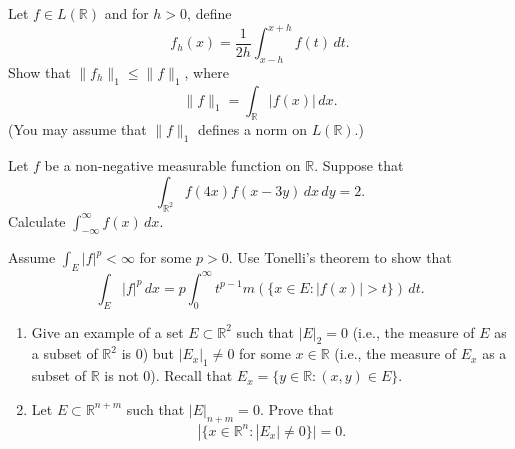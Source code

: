 
\begin{problem}{1}
Let $f \in L(\mathbb{R})$ and for $h > 0$, define
\[
f_h(x) = \frac{1}{2h} \int_{x-h}^{x+h} f(t) \, dt.
\]
Show that $\|f_h\|_1 \leq \|f\|_1$, where
\[
\|f\|_1 = \int_{\mathbb{R}} |f(x)| \, dx.
\]
(You may assume that $\|f\|_1$ defines a norm on $L(\mathbb{R})$.)
\end{problem}


\begin{solution}
\end{solution}

\pagebreak

\begin{problem}{2}
Let $f$ be a non-negative measurable function on $\mathbb{R}$. Suppose that
\[
\int_{\mathbb{R}^2} f(4x)f(x - 3y) \, dx \, dy = 2.
\]
Calculate $\int_{-\infty}^\infty f(x) \, dx$.
\end{problem}

\begin{solution}
\end{solution}

\pagebreak



\begin{problem}{3}
Assume $\int_E |f|^p < \infty$ for some $p > 0$. Use Tonelli's theorem to show that
\[
\int_E |f|^p \, dx = p \int_0^\infty t^{p-1} m(\{x \in E : |f(x)| > t\}) \, dt.
\]
\end{problem}

\begin{solution}
\end{solution}

\pagebreak



\begin{problem}{4}
\begin{enumerate}
    \item Give an example of a set $E \subset \mathbb{R}^2$ such that $|E|_2 = 0$ (i.e., the measure of $E$ as a subset of $\mathbb{R}^2$ is 0) but $|E_x|_1 \neq 0$ for some $x \in \mathbb{R}$ (i.e., the measure of $E_x$ as a subset of $\mathbb{R}$ is not 0). Recall that $E_x = \{y \in \mathbb{R} : (x, y) \in E\}$.

    \item Let $E \subset \mathbb{R}^{n+m}$ such that $|E|_{n+m} = 0$. Prove that 
    \[
    |\{x \in \mathbb{R}^n : |E_x| \neq 0\}| = 0.
    \]
\end{enumerate}
\end{problem}

